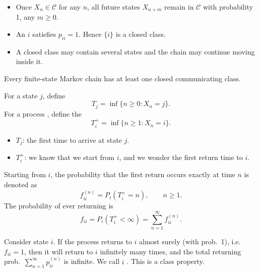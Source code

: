 \documentclass[8pt,a4paper,landscape]{extarticle}
\begin{document}
\begin{cscolumns}
\begin{remark}
\begin{itemize}\setlength\itemsep{0pt}\setlength\topsep{0pt}
\item Once $X_n\in\mathcal{C}$ for any $n$, all future states $X_{n+m}$ remain in $\mathcal{C}$ with probability 1, any $m\ge 0$.
\item An  $i$ satisfies $p_{ii}=1$. Hence $\{i\}$ is a closed class.
\item A closed class may contain several states and the chain may continue moving inside it.
\end{itemize}
\end{remark}

\begin{theorem}
Every finite-state Markov chain has at least one closed communicating class.
\end{theorem}

\begin{definition}
For a state $j$, define
\[ T_j=\inf\{n\ge 0: X_n=j\}. \]
For a process , define the 
\[ T_i^{+}=\inf\{n\ge 1: X_n=i\}. \]
\end{definition}

\begin{remark}
\begin{itemize}\setlength\itemsep{0pt}\setlength\topsep{0pt}
\item $T_j$: the first time to arrive at state $j$.
\item $T_i^{+}$: we know that we start from $i$, and we wonder the first return time to $i$.
\end{itemize}
\end{remark}

\begin{definition}
Starting from $i$, the probability that the first return occurs exactly at time $n$ is denoted as
\[ f_{ii}^{(n)}=P_i(T_i^{+}=n), \qquad n\ge 1. \]
The probability of ever returning is
\[ f_{ii}=P_i(T_i^{+}<\infty)=\sum_{n=1}^{\infty} f_{ii}^{(n)}. \]
\end{definition}

\begin{takeaway}
Consider state $i$. If the process returns to $i$ almost surely (with prob.\ 1), i.e.\ $f_{ii}=1$, then it will return to $i$ infinitely many times, and the total returning prob.\ $\sum\nolimits_{n=1}^{\infty}p_{ii}^{(n)}$ is infinite. We call $i$ . This is a class property.
\end{takeaway}


\end{cscolumns}
\end{document}
